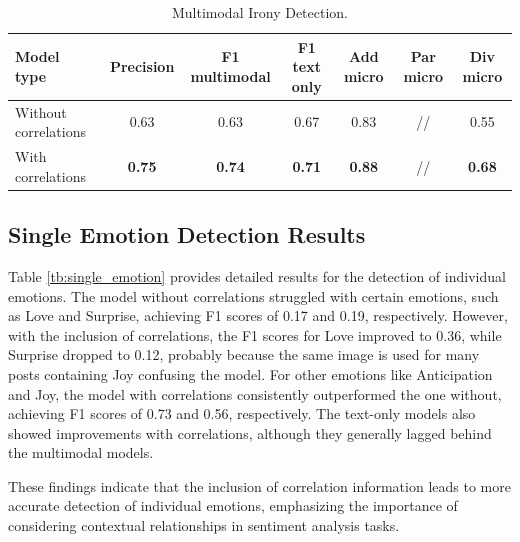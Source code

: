 \documentclass[letterpaper,journal]{IEEEtran}
\begin{document}
\begin{table}[htb!]
\begin{center}
{\footnotesize
\begin{tabular}{l|c|c|c|c|c|c}
\hline
\textbf{Model type} & \textbf{Precision} & \textbf{F1 multimodal} & \textbf{F1 text only} & \textbf{Add micro} & \textbf{Par micro} & \textbf{Div micro} \\
\hline
Without correlations & 0.63 & 0.63 & 0.67 & 0.83 & // & 0.55 \\
With correlations & \textbf{0.75} & \textbf{0.74} & \textbf{0.71} & \textbf{0.88} & // & \textbf{0.68} \\
\hline
\end{tabular}
}
\end{center}
\setlength{\belowcaptionskip}{-0.1cm}
\caption{Multimodal Irony Detection.}
\label{tb:irony_multi}
\end{table}

\subsection{Single Emotion Detection Results}

Table \ref{tb:single_emotion} provides detailed results for the detection of individual emotions. The model without correlations struggled with certain emotions, such as Love and Surprise, achieving F1 scores of 0.17 and 0.19, respectively. However, with the inclusion of correlations, the F1 scores for Love improved to 0.36, while Surprise dropped to 0.12, probably because the same image is used for many posts containing Joy confusing the model. For other emotions like Anticipation and Joy, the model with correlations consistently outperformed the one without, achieving F1 scores of 0.73 and 0.56, respectively. The text-only models also showed improvements with correlations, although they generally lagged behind the multimodal models.

These findings indicate that the inclusion of correlation information leads to more accurate detection of individual emotions, emphasizing the importance of considering contextual relationships in sentiment analysis tasks.
\end{document}

